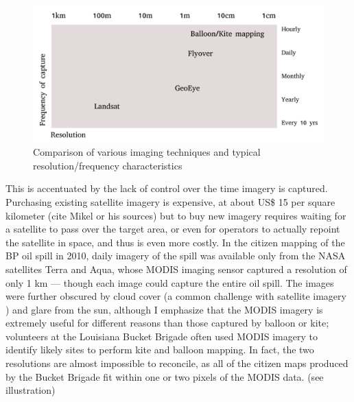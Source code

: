 \documentclass[11pt]{report}
\begin{document}

\begin{figure}[h]
  \begin{center}
	\includegraphics[width=1\textwidth]{diagrams/resolution-frequency.pdf}
	\caption{Comparison of various imaging techniques and typical resolution/frequency characteristics}
  \end{center}
\end{figure}

This is accentuated by the lack of control over the time imagery is captured. Purchasing existing satellite imagery is expensive, at about US\$ 15 per square kilometer (cite Mikel or his sources) but to buy new imagery requires waiting for a satellite to pass over the target area, or even for operators to actually repoint the satellite in space, and thus is even more costly. In the citizen mapping of the BP oil spill in 2010, daily imagery of the spill was available only from the NASA satellites Terra and Aqua, whose MODIS imaging sensor captured a resolution of only 1 km --- though each image could capture the entire oil spill. The images were further obscured by cloud cover (a common challenge with satellite imagery \cite{miyamoto2004use}) and glare from the sun, although I emphasize that the MODIS imagery is extremely useful for different reasons than those captured by balloon or kite; volunteers at the Louisiana Bucket Brigade often used MODIS imagery to identify likely sites to perform kite and balloon mapping. In fact, the two resolutions are almost impossible to reconcile, as all of the citizen maps produced by the Bucket Brigade fit within one or two pixels of the MODIS data. (see illustration)

\end{document}
